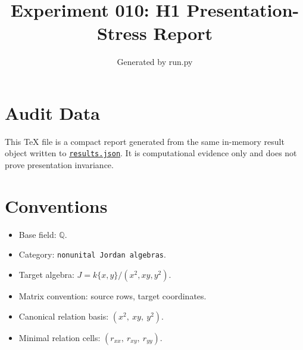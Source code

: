 \documentclass[11pt]{article}
\title{Experiment 010: H1 Presentation-Stress Report}
\author{Generated by run.py}
\date{}
\begin{document}
\maketitle

\section{Audit Data}
This TeX file is a compact report generated from the same in-memory result object written to \href{results.json}{\texttt{results.json}}.  It is computational evidence only and does not prove presentation invariance.

\section{Conventions}
\begin{itemize}
\item Base field: \(\mathbb{Q}\).
\item Category: \texttt{nonunital Jordan algebras}.
\item Target algebra: \(J=k\{x,y\}/(x^2,xy,y^2)\).
\item Matrix convention: source rows, target coordinates.
\item Canonical relation basis: \((x^2,\ xy,\ y^2)\).
\item Minimal relation cells: \((r_{xx},\ r_{xy},\ r_{yy})\).
\end{itemize}
\end{document}
